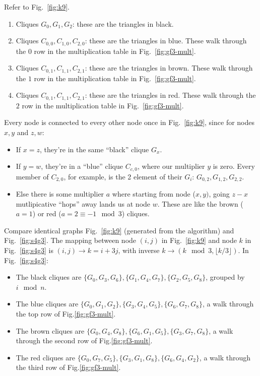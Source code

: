 \documentclass[11pt, oneside]{article} 	%
\begin{document}
Refer to Fig.~\ref{fig:k9}.

\begin{enumerate}
\item Cliques $G_0, G_1, G_2$: these are the triangles in black. 
\item Cliques $C_{0,0}, C_{1, 0}, C_{2,0}$: these are the triangles in blue. These walk through the $0$ row in the multiplication table in Fig.~\ref{fig:gf3-mult}.
\item Cliques $C_{0,1}, C_{1, 1}, C_{2,1}$: these are the triangles in brown.  These walk through the $1$ row in the multiplication table in Fig.~\ref{fig:gf3-mult}.
\item Cliques $C_{0,1}, C_{1, 1}, C_{2,1}$: these are the triangles in red. These walk through the $2$ row in the multiplication table in Fig.~\ref{fig:gf3-mult}.
\end{enumerate}


Every node is connected to every other node once in Fig.~\ref{fig:k9}, since for nodes $x,y$ and $z,w$:
\begin{itemize}
\item If $x = z$, they're in the same ``black'' clique $G_x$.
\item If $y=w$, they're in a ``blue'' clique $C_{c,0}$, where our multiplier $y$ is zero.  Every member of $C_{2,0}$, for example, is the 2 element of their $G_i$: $G_{0,2}, G_{1,2}, G_{2,2}$.
\item Else there is some multiplier $a$ where starting from node ($x,y)$, going $z-x$ mutlipicative ``hops'' away lands us at node $w$.  These are like the brown ($a=1$) or red ($a=2\equiv -1 \mod 3 $) cliques.
\end{itemize}

Compare identical graphs Fig.~\ref{fig:k9} (generated from the algorithm) and Fig.~\ref{fig:s4g3}. The mapping between node $(i,j)$ in Fig.~\ref{fig:k9} and node $k$ in Fig.~\ref{fig:s4g3} is $(i,j) \rightarrow k=i+3j$, with inverse $k \rightarrow (k \mod 3, \lfloor k / 3 \rfloor)$.  In Fig.~\ref{fig:s4g3}:
\begin{itemize}
\item The black cliques are $\{G_0, G_3, G_6\}, \{G_1, G_4, G_7\}, \{G_2, G_5, G_8\}$, grouped by $i \mod n$.
\item The blue cliques are $\{G_0, G_1, G_2\}, \{G_3, G_4, G_5\}, \{G_6, G_7, G_8\}$, a walk through the top row of Fig.\ref{fig:gf3-mult}.
\item The brown cliques are $\{G_0, G_4, G_8\}, \{G_6, G_1, G_5\}, \{G_3, G_7, G_8\}$, a walk through the second row of Fig.\ref{fig:gf3-mult}.
\item The red cliques are $\{G_0, G_7, G_5\}, \{G_3, G_1, G_8\}, \{G_6, G_4, G_2\}$, a walk through the third row of Fig.\ref{fig:gf3-mult}.
\end{itemize}
\end{document}
